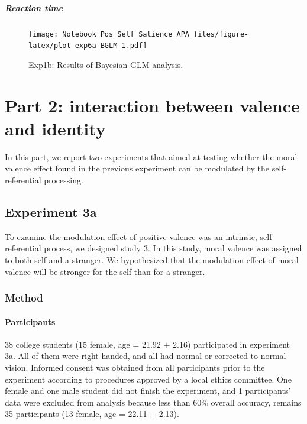 \documentclass[
  english,
  man]{apa6}
\let\oldparagraph\paragraph
\renewcommand{\paragraph}[1]{\oldparagraph{#1}\mbox{}}
\let\oldsubparagraph\subparagraph
\renewcommand{\subparagraph}[1]{\oldsubparagraph{#1}\mbox{}}
\begin{document}
\hypertarget{reaction-time-3}{%
\subparagraph{Reaction time}\label{reaction-time-3}}

\begin{figure}
\centering
\texttt{[image: Notebook\_Pos\_Self\_Salience\_APA\_files/figure-latex/plot-exp6a-BGLM-1.pdf]}
\caption{\label{fig:plot-exp6a-BGLM}Exp1b: Results of Bayesian GLM analysis.}
\end{figure}

\hypertarget{part-2-interaction-between-valence-and-identity}{%
\section{Part 2: interaction between valence and identity}\label{part-2-interaction-between-valence-and-identity}}

In this part, we report two experiments that aimed at testing whether the moral valence effect found in the previous experiment can be modulated by the self-referential processing.

\hypertarget{experiment-3a}{%
\subsection{Experiment 3a}\label{experiment-3a}}

To examine the modulation effect of positive valence was an intrinsic, self-referential process, we designed study 3. In this study, moral valence was assigned to both self and a stranger. We hypothesized that the modulation effect of moral valence will be stronger for the self than for a stranger.

\hypertarget{method-4}{%
\subsubsection{Method}\label{method-4}}

\hypertarget{participants-5}{%
\paragraph{Participants}\label{participants-5}}

38 college students (15 female, age = 21.92 \(\pm\) 2.16) participated in experiment 3a. All of them were right-handed, and all had normal or corrected-to-normal vision. Informed consent was obtained from all participants prior to the experiment according to procedures approved by a local ethics committee. One female and one male student did not finish the experiment, and 1 participants' data were excluded from analysis because less than 60\% overall accuracy, remains 35 participants (13 female, age = 22.11 \(\pm\) 2.13).
\end{document}
